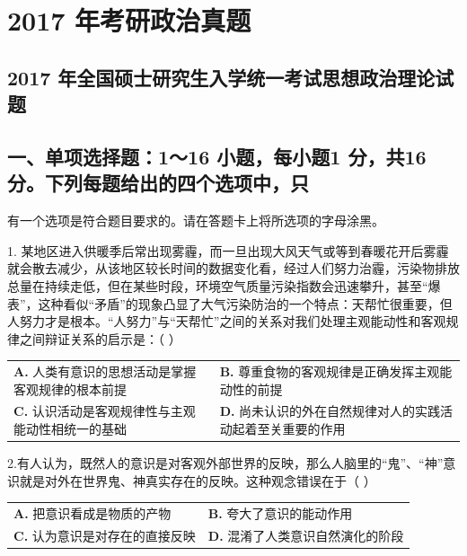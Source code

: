 \documentclass[UTF8,11pt]{ctexart}
\begin{document}
\section*{2017 年考研政治真题}
\subsection*{2017 年全国硕士研究生入学统一考试思想政治理论试题}

\subsection*{一、单项选择题：1～16 小题，每小题1 分，共16 分。下列每题给出的四个选项中，只}

有一个选项是符合题目要求的。请在答题卡上将所选项的字母涂黑。


1. 某地区进入供暖季后常出现雾霾，而一旦出现大风天气或等到春暖花开后雾霾就会散去减少，从该地区较长时间的数据变化看，经过人们努力治霾，污染物排放总量在持续走低，但在某些时段，环境空气质量污染指数会迅速攀升，甚至“爆表”，这种看似“矛盾”的现象凸显了大气污染防治的一个特点：天帮忙很重要，但人努力才是根本。“人努力”与“天帮忙”之间的关系对我们处理主观能动性和客观规律之间辩证关系的启示是：（  ）


\begin{center}\begin{tabular}{>{\raggedright\arraybackslash}p{\dimexpr(\linewidth-4\tabcolsep)/2\relax}>{\raggedright\arraybackslash}p{\dimexpr(\linewidth-4\tabcolsep)/2\relax}}
\textbf{A.} 人类有意识的思想活动是掌握客观规律的根本前提 & \textbf{B.} 尊重食物的客观规律是正确发挥主观能动性的前提\\[.35em]
\textbf{C.} 认识活动是客观规律性与主观能动性相统一的基础 & \textbf{D.} 尚未认识的外在自然规律对人的实践活动起着至关重要的作用\\[.35em]\end{tabular}\end{center}

2.有人认为，既然人的意识是对客观外部世界的反映，那么人脑里的“鬼”、“神”意识就是对外在世界鬼、神真实存在的反映。这种观念错误在于（  ）


\begin{center}\begin{tabular}{>{\raggedright\arraybackslash}p{\dimexpr(\linewidth-4\tabcolsep)/2\relax}>{\raggedright\arraybackslash}p{\dimexpr(\linewidth-4\tabcolsep)/2\relax}}
\textbf{A.} 把意识看成是物质的产物 & \textbf{B.} 夸大了意识的能动作用\\[.35em]
\textbf{C.} 认为意识是对存在的直接反映 & \textbf{D.} 混淆了人类意识自然演化的阶段\\[.35em]\end{tabular}\end{center}
\end{document}
